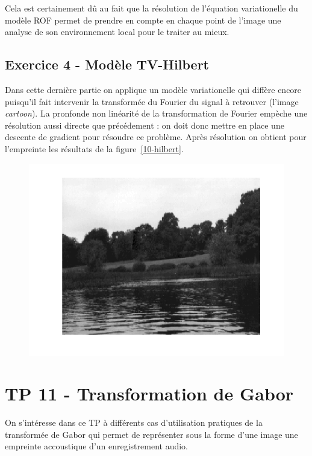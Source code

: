 \documentclass{article}
\begin{document}
Cela est certainement dû au fait que la résolution de l'équation variationelle du modèle ROF permet de prendre en compte en chaque point de l'image une analyse de son environnement local pour le traiter au mieux.

\subsection{Exercice 4 - Modèle TV-Hilbert}
Dans cette dernière partie on applique un modèle variationelle qui diffère encore puisqu'il fait intervenir la transformée du Fourier du signal à retrouver (l'image \emph{cartoon}). La pronfonde non linéarité de la transformation de Fourier empèche une résolution aussi directe que précédement : on doit donc mettre en place une descente de gradient pour résoudre ce problème. Après résolution on obtient pour l'empreinte les résultats de la figure~\ref{10-hilbert}.

\begin{figure}[!ht]
\includegraphics[width=\textwidth]{images/1/1-1-autumn_b.png}
\end{figure}




\section{TP 11 - Transformation de Gabor}
On s'intéresse dans ce TP à différents cas d'utilisation pratiques de la transformée de Gabor qui permet de représenter sous la forme d'une image une empreinte accoustique d'un enregistrement audio.
\end{document}

